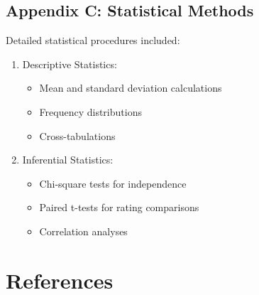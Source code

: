 \documentclass[
  letterpaper,
  DIV=11,
  numbers=noendperiod]{scrartcl}
\providecommand{\tightlist}{%
  \setlength{\itemsep}{0pt}\setlength{\parskip}{0pt}}\usepackage{longtable,booktabs,array}
\begin{document}
\subsection{Appendix C: Statistical
Methods}\label{appendix-c-statistical-methods}

Detailed statistical procedures included:

\begin{enumerate}
\def\labelenumi{\arabic{enumi}.}
\tightlist
\item
  Descriptive Statistics:

  \begin{itemize}
  \tightlist
  \item
    Mean and standard deviation calculations
  \item
    Frequency distributions
  \item
    Cross-tabulations
  \end{itemize}
\item
  Inferential Statistics:

  \begin{itemize}
  \tightlist
  \item
    Chi-square tests for independence
  \item
    Paired t-tests for rating comparisons
  \item
    Correlation analyses
  \end{itemize}
\end{enumerate}

\section*{References}\label{references}
\end{document}
